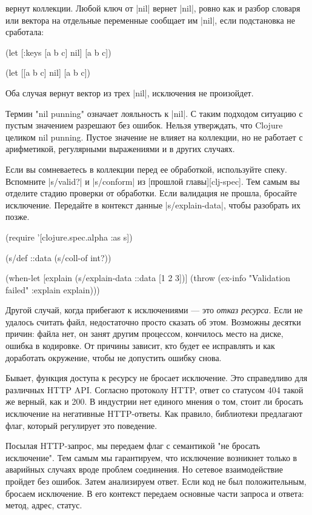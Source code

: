 вернут коллекции. Любой ключ от \spverb|nil| вернет \spverb|nil|, ровно как и разбор словаря
или вектора на отдельные переменные сообщает им \spverb|nil|, если подстановка не
сработала:

\begin{code}
(let [{:keys [a b c]} nil]
  [a b c])

(let [[a b c] nil]
  [a b c])
\end{code}

Оба случая вернут вектор из трех \spverb|nil|, исключения не произойдет.

Термин "nil punning" означает лояльность к \spverb|nil|. С таким подходом ситуацию с
пустым значением разрешают без ошибок. Нельзя утверждать, что Clojure целиком
nil punning. Пустое значение не влияет на коллекции, но не работает с
арифметикой, регулярными выражениями и в других случаях.

Если вы сомневаетесь в коллекции перед ее обработкой, используйте
спеку. Вспомните \spverb|s/valid?| и \spverb|s/conform| из [прошлой главы][clj-spec]. Тем
самым вы отделите стадию проверки от обработки. Если валидация не прошла,
бросайте исключение. Передайте в контекст данные \spverb|s/explain-data|, чтобы
разобрать их позже.

\begin{code}
(require '[clojure.spec.alpha :as s])

(s/def ::data (s/coll-of int?))

(when-let [explain (s/explain-data ::data [1 2 3])]
  (throw (ex-info "Validation failed" {:explain explain})))
\end{code}

Другой случай, когда прибегают к исключениями — это \emph{отказ ресурса}. Если не
удалось считать файл, недостаточно просто сказать об этом. Возможны десятки
причин: файла нет, он занят другим процессом, кончилось место на диске, ошибка в
кодировке. От причины зависит, кто будет ее исправлять и как доработать
окружение, чтобы не допустить ошибку снова.

Бывает, функция доступа к ресурсу не бросает исключение. Это справедливо для
различных HTTP API. Согласно протоколу HTTP, ответ со статусом 404 такой же
верный, как и 200. В индустрии нет единого мнения о том, стоит ли бросать
исключение на негативные HTTP-ответы. Как правило, библиотеки предлагают флаг,
который регулирует это поведение.

Посылая HTTP-запрос, мы передаем флаг с семантикой "не бросать исключение". Тем
самым мы гарантируем, что исключение возникнет только в аварийных случаях вроде
проблем соединения. Но сетевое взаимодействие пройдет без ошибок. Затем
анализируем ответ. Если код не был положительным, бросаем исключение. В его
контекст передаем основные части запроса и ответа: метод, адрес, статус.

